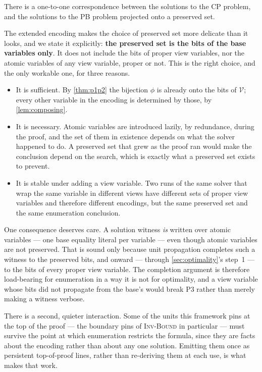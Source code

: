 \documentclass[11pt,a4paper]{article}
\theoremstyle{plain}
\theoremstyle{definition}
\theoremstyle{remark}
\newcommand{\inv}[1]{\textnormal{\textsc{Inv-#1}}}
\begin{document}
\begin{description}[font=\normalfont\bfseries,leftmargin=2.4em]
  \item[P3.] There is a one-to-one correspondence between the solutions to the
    CP problem, and the solutions to the PB problem projected onto a preserved
    set.
\end{description}

The extended encoding makes the choice of preserved set more delicate than it
looks, and we state it explicitly: \textbf{the preserved set is the bits of the
base variables only}.  It does not include the bits of proper view variables,
nor the atomic variables of any view variable, proper or not.  This is the right choice, and
the only workable one, for three reasons.

\begin{itemize}[itemsep=1pt]
  \item It is sufficient.  By \cref{thm:p1p2} the bijection $\phi$ is already
    onto the bits of $\mathcal V$; every other variable in the encoding is
    determined by those, by \cref{lem:composing}.
  \item It is necessary.  Atomic variables are introduced lazily, by redundance,
    during the proof, and the set of them in existence depends on what the
    solver happened to do.  A preserved set that grew as the proof ran would make
    the conclusion depend on the search, which is exactly what a preserved set
    exists to prevent.
  \item It is stable under adding a view variable.  Two runs of the same solver
    that wrap the same variable in different views have different sets of
    proper view variables and therefore different encodings, but the same
    preserved set and the same enumeration conclusion.
\end{itemize}

One consequence deserves care.  A solution witness \emph{is} written over atomic
variables --- one base equality literal per variable --- even though atomic
variables are not preserved.  That is sound only because unit propagation
completes such a witness to the preserved bits, and onward --- through
\cref{sec:optimality}'s step~1 --- to the bits of every proper view variable.
The completion argument is therefore load-bearing for enumeration in a way it is
not for optimality, and a view variable whose bits did not propagate from the
base's would break P3 rather than merely making a witness verbose.

There is a second, quieter interaction.  Some of the units this framework pins
at the top of the proof --- the boundary pins of \inv{Bound} in particular ---
must survive the point at which enumeration restricts the formula, since they
are facts about the encoding rather than about any one solution.  Emitting them
once as persistent top-of-proof lines, rather than re-deriving them at each use,
is what makes that work.
\end{document}
